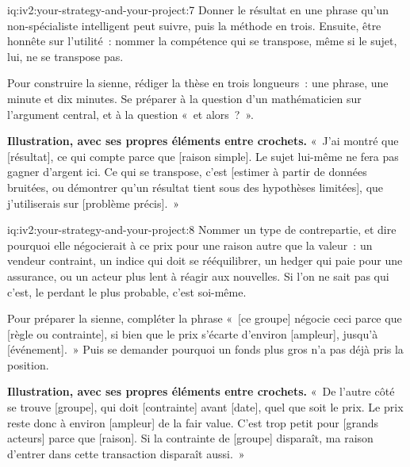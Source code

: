 \begin{solution}{iq:iv2:your-strategy-and-your-project:7}
Donner le résultat en une phrase qu'un non-spécialiste intelligent peut suivre, puis la méthode en trois. Ensuite, être honnête sur l'utilité~: nommer la compétence qui se transpose, même si le sujet, lui, ne se transpose pas.

Pour construire la sienne, rédiger la thèse en trois longueurs~: une phrase, une minute et dix minutes. Se préparer à la question d'un mathématicien sur l'argument central, et à la question «~et alors~?~».

\textbf{Illustration, avec ses propres éléments entre crochets.} «~J'ai montré que [résultat], ce qui compte parce que [raison simple]. Le sujet lui-même ne fera pas gagner d'argent ici. Ce qui se transpose, c'est [estimer à partir de données bruitées, ou démontrer qu'un résultat tient sous des hypothèses limitées], que j'utiliserais sur [problème précis].~»

\end{solution}

\begin{solution}{iq:iv2:your-strategy-and-your-project:8}
Nommer un type de contrepartie, et dire pourquoi elle négocierait à ce prix pour une raison autre que la valeur~: un vendeur contraint, un indice qui doit se rééquilibrer, un hedger qui paie pour une assurance, ou un acteur plus lent à réagir aux nouvelles. Si l'on ne sait pas qui c'est, le perdant le plus probable, c'est soi-même.

Pour préparer la sienne, compléter la phrase «~[ce groupe] négocie ceci parce que [règle ou contrainte], si bien que le prix s'écarte d'environ [ampleur], jusqu'à [événement].~» Puis se demander pourquoi un fonds plus gros n'a pas déjà pris la position.

\textbf{Illustration, avec ses propres éléments entre crochets.} «~De l'autre côté se trouve [groupe], qui doit [contrainte] avant [date], quel que soit le prix. Le prix reste donc à environ [ampleur] de la fair value. C'est trop petit pour [grands acteurs] parce que [raison]. Si la contrainte de [groupe] disparaît, ma raison d'entrer dans cette transaction disparaît aussi.~»

\end{solution}

